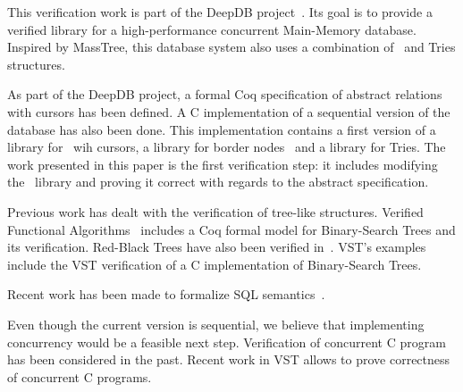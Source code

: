 This verification work is part of the DeepDB project~\cite{deepdb}.
Its goal is to provide a verified library for a high-performance concurrent Main-Memory database.
Inspired by MassTree, this database system also uses a combination of \btrees\ and Tries structures.

As part of the DeepDB project, a formal Coq specification of abstract relations with cursors has been defined.
A C implementation of a sequential version of the database has also been done.
This implementation contains a first version of a library for \btrees\ wih cursors, a library for border nodes~\cite{masstree} and a library for Tries.
The work presented in this paper is the first verification step: it includes modifying the \btrees\ library and proving it correct with regards to the abstract specification.

Previous work has dealt with the verification of tree-like structures.
Verified Functional Algorithms~\cite{vfa} includes a Coq formal model for Binary-Search Trees and its verification.
Red-Black Trees have also been verified in~\cite{redblack}.
VST's examples~\cite{vst} include the VST verification of a C implementation of Binary-Search Trees.

Recent work has been made to formalize SQL semantics~\cite{coqsql}.

Even though the current version is sequential, we believe that implementing concurrency would be a feasible next step.
Verification of concurrent C program has been considered in the past.
Recent work in VST allows to prove correctness of concurrent C programs.


